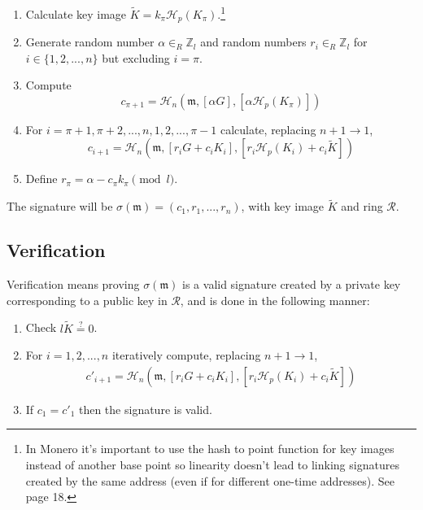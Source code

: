 \begin{enumerate}
	\item Calculate key image \(\tilde{K} = k_\pi \mathcal{H}_p(K_\pi)\).\footnote{In Monero it's important to use the hash to point function for key images instead of another base point so linearity doesn't lead to linking signatures created by the same address (even if for different one-time addresses). See \cite{cryptoNoteWhitePaper} page 18.}

	\item Generate random number \(\alpha \in_R \mathbb{Z}_l\) and random numbers \(r_i \in_R \mathbb{Z}_l\) for \(i \in \{1, 2, ..., n\}\) but excluding \(i = \pi\).

	\item Compute
	\[c_{\pi+1} = \mathcal{H}_n(\mathfrak{m}, [\alpha G], [\alpha \mathcal{H}_p(K_\pi)])\]

	\item For \(i = \pi+1, \pi+2, ..., n, 1, 2, ..., \pi-1\) calculate, replacing \(n + 1 \rightarrow 1\),\vspace{.175cm}
	\[c_{i+1} = \mathcal{H}_n(\mathfrak{m}, [r_i G + c_i K_i], [r_i \mathcal{H}_p(K_i) + c_i \tilde{K}])\]

	\item Define \(r_\pi = \alpha - c_\pi k_\pi \pmod l\).
\end{enumerate}

The signature will be \(\sigma(\mathfrak{m}) = (c_1, r_1, ..., r_n)\), with key image $\tilde{K}$ and ring $\mathcal{R}$.


\subsection*{Verification}

Verification means proving $\sigma(\mathfrak{m})$ is a valid signature created by a private key corresponding to a public key in $\mathcal{R}$, and is done in the following manner:

\begin{enumerate}
    \item Check $l \tilde{K} \stackrel{?}{=} 0$.
	\item For \(i = 1, 2, ..., n\) iteratively compute, replacing \(n + 1 \rightarrow 1\),\vspace{.175cm}
	\begin{align*}
	c'_{i+1} = \mathcal{H}_n(\mathfrak{m}, [r_i G + c_i {K_i}], [r_i \mathcal{H}_p(K_i) + c_i \tilde{K}])
	\end{align*}

	\item If \(c_1 = c'_1\) then the signature is valid.
\end{enumerate}

